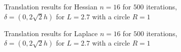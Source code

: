 \begin{figure}[hpbt!]
\centering

\subfloat[]{%

}

\subfloat[]{%

}


\caption{ Translation results for Hessian $n=16$ for $500$ iterations, $\delta =(0, 2 \sqrt{2}h) $ for $L=2.7$ with a circle $R=1$       }

\label{fig:trans_hes}
\end{figure}

\begin{figure}[hpbt!]
\centering

\subfloat[]{%

}

\subfloat[]{%

}


\caption{ Translation results for Laplace $n=16$ for $500$ iterations, $\delta =(0, 2 \sqrt{2}h) $ for $L=2.7$ with a circle $R=1$       }

\label{fig:trans_lap}
\end{figure}

